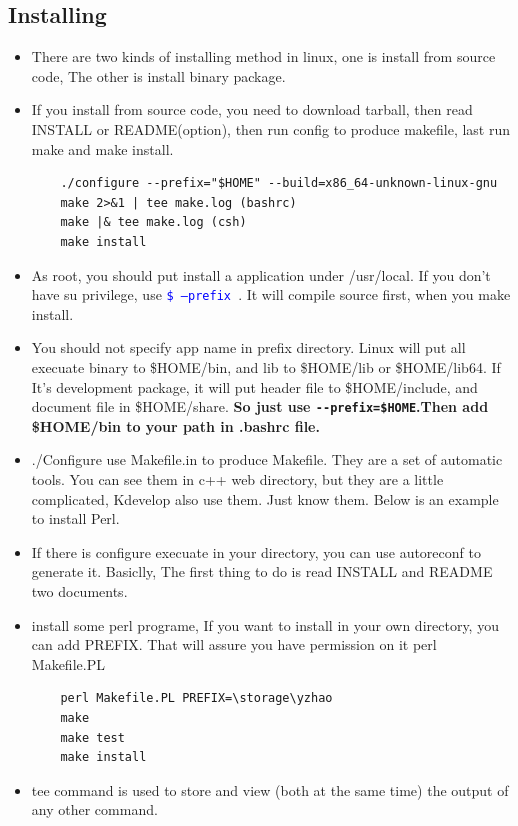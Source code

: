 \documentclass[a4paper,12pt,twoside]{book}
\newcommand{\linuxcommand}[1]{\texttt{\textcolor{blue}{\$ #1 \Pisymbol{psy}{191}}}}
\begin{document}
\subsection{Installing}
	\begin{itemize}
	\item There are two kinds of installing method in linux, one is install from source code, The other is install binary package.

    \item If you install from source code, you need to download tarball, then read INSTALL or README(option), then run config to produce makefile, last run make and make install.
         \begin{verbatim}
	./configure --prefix="$HOME" --build=x86_64-unknown-linux-gnu 
	make 2>&1 | tee make.log (bashrc)
	make |& tee make.log (csh)
	make install 
    \end{verbatim}

     \item As root, you should put install a application under /usr/local. If you don't have su privilege, use \linuxcommand{--prefix}.  It will compile source first, when you make install.

	 \item You should not specify app name in prefix directory. Linux will put all execuate binary to \$HOME/bin, and lib to \$HOME/lib or \$HOME/lib64. If It's development package, it will put header file to \$HOME/include, and document file in \$HOME/share. \textbf{So just use \verb!--prefix=$HOME!.Then add \$HOME/bin to your path in .bashrc file.}

	
		\item./Configure use Makefile.in to produce Makefile. They are a set of automatic tools. You can see them in c++ web directory, but they are a little complicated, Kdevelop also use them.  Just know them.  Below is an example to install Perl.
\item If there is configure execuate in your directory, you can use autoreconf to generate it. Basiclly, The first thing to do is read INSTALL and README two documents. 

	 \item install some perl programe, If you want to install in your own directory, you can add PREFIX. That will assure you have permission on it
  	 perl Makefile.PL
    \begin{verbatim}
    perl Makefile.PL PREFIX=\storage\yzhao
    make
    make test
    make install
    \end{verbatim}
\item tee command is used to store and view (both at the same time) the output of any other command. 


\end{itemize}
\end{document}
